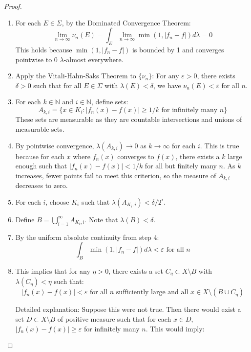 \documentclass{article}
\begin{document}
\begin{proof}
\begin{enumerate}
    \item For each $E \in \Sigma$, by the Dominated Convergence Theorem:
    \[\lim_{n\to\infty} \nu_n(E) = \int_E \lim_{n\to\infty} \min(1, |f_n - f|) d\lambda = 0\]
    This holds because $\min(1, |f_n - f|)$ is bounded by 1 and converges pointwise to 0 $\lambda$-almost everywhere.
    
    \item Apply the Vitali-Hahn-Saks Theorem to $\{\nu_n\}$: For any $\varepsilon > 0$, there exists $\delta > 0$ such that for all $E \in \Sigma$ with $\lambda(E) < \delta$, we have $\nu_n(E) < \varepsilon$ for all $n$.
    
    \item For each $k \in \mathbb{N}$ and $i \in \mathbb{N}$, define sets:
    \[A_{k,i} = \{x \in K_i : |f_n(x) - f(x)| \geq 1/k \text{ for infinitely many } n\}\]
    These sets are measurable as they are countable intersections and unions of measurable sets.
    
    \item By pointwise convergence, $\lambda(A_{k,i}) \to 0$ as $k \to \infty$ for each $i$. This is true because for each $x$ where $f_n(x)$ converges to $f(x)$, there exists a $k$ large enough such that $|f_n(x) - f(x)| < 1/k$ for all but finitely many $n$. As $k$ increases, fewer points fail to meet this criterion, so the measure of $A_{k,i}$ decreases to zero.
    
    \item For each $i$, choose $K_i$ such that $\lambda(A_{K_i,i}) < \delta/2^i$.
    
    \item Define $B = \bigcup_{i=1}^{\infty} A_{K_i,i}$. Note that $\lambda(B) < \delta$.
    
    \item By the uniform absolute continuity from step 4:
    \[\int_B \min(1, |f_n - f|) d\lambda < \varepsilon \text{ for all } n\]
    
    \item This implies that for any $\eta > 0$, there exists a set $C_\eta \subset X \setminus B$ with $\lambda(C_\eta) < \eta$ such that:
    \[|f_n(x) - f(x)| < \varepsilon \text{ for all } n \text{ sufficiently large and all } x \in X \setminus (B \cup C_\eta)\]
    
    Detailed explanation: Suppose this were not true. Then there would exist a set $D \subset X \setminus B$ of positive measure such that for each $x \in D$, $|f_n(x) - f(x)| \geq \varepsilon$ for infinitely many $n$. This would imply:
    

\end{enumerate}
\end{proof}
\end{document}
